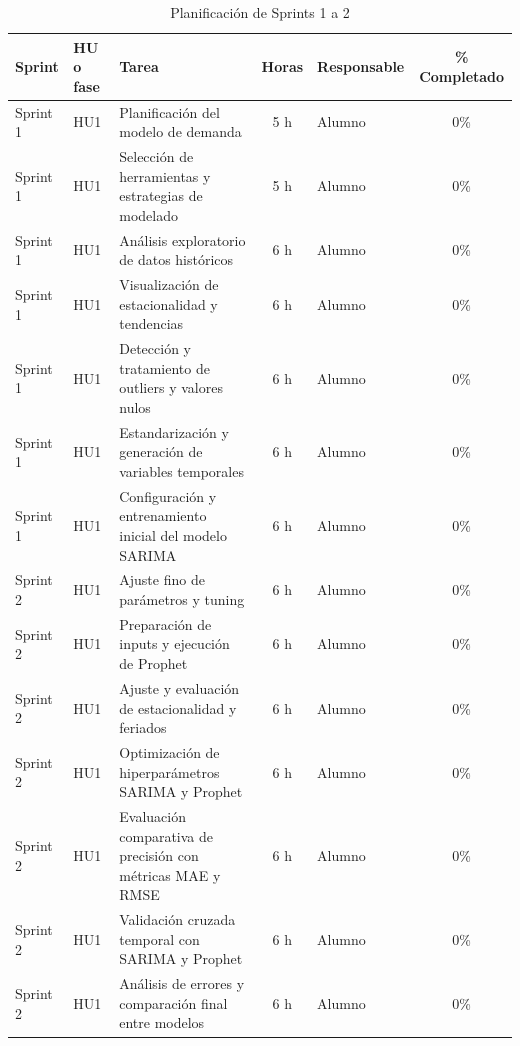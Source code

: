 \documentclass[
11pt, %
]{charter}
\begin{document}
\begin{table}[htpb]
\centering
\caption{Planificación de Sprints 1 a 2}
\begin{tabularx}{\linewidth}{@{}|l|l|X|c|l|c|@{}}
\hline
\rowcolor[HTML]{C0C0C0}
Sprint & HU o fase & Tarea & Horas & Responsable & \% Completado \\ \hline
Sprint 1 & HU1 & Planificación del modelo de demanda & 5 h & Alumno & 0\% \\ \hline
Sprint 1 & HU1 & Selección de herramientas y estrategias de modelado & 5 h & Alumno & 0\% \\ \hline
Sprint 1 & HU1 & Análisis exploratorio de datos históricos & 6 h & Alumno & 0\% \\ \hline
Sprint 1 & HU1 & Visualización de estacionalidad y tendencias & 6 h & Alumno & 0\% \\ \hline
Sprint 1 & HU1 & Detección y tratamiento de outliers y valores nulos & 6 h & Alumno & 0\% \\ \hline
Sprint 1 & HU1 & Estandarización y generación de variables temporales & 6 h & Alumno & 0\% \\ \hline
Sprint 1 & HU1 & Configuración y entrenamiento inicial del modelo SARIMA & 6 h & Alumno & 0\% \\ \hline
Sprint 2 & HU1 & Ajuste fino de parámetros y tuning & 6 h & Alumno & 0\% \\ \hline
Sprint 2 & HU1 & Preparación de inputs y ejecución de Prophet & 6 h & Alumno & 0\% \\ \hline
Sprint 2 & HU1 & Ajuste y evaluación de estacionalidad y feriados & 6 h & Alumno & 0\% \\ \hline
Sprint 2 & HU1 & Optimización de hiperparámetros SARIMA y Prophet & 6 h & Alumno & 0\% \\ \hline
Sprint 2 & HU1 & Evaluación comparativa de precisión con métricas MAE y RMSE & 6 h & Alumno & 0\% \\ \hline
Sprint 2 & HU1 & Validación cruzada temporal con SARIMA y Prophet & 6 h & Alumno & 0\% \\ \hline
Sprint 2 & HU1 & Análisis de errores y comparación final entre modelos & 6 h & Alumno & 0\% \\ \hline
\end{tabularx}
\end{table}
\end{document}
